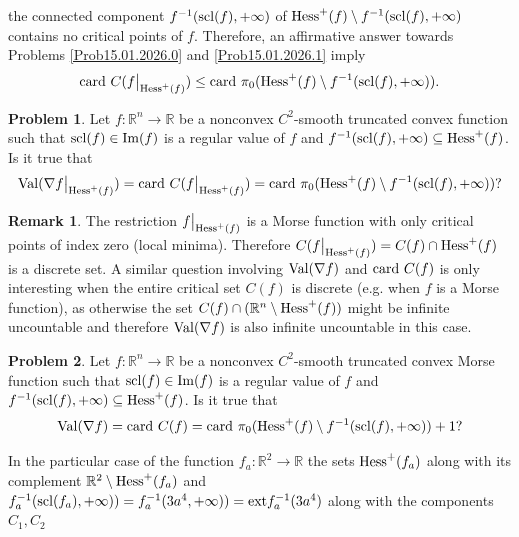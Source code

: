 \documentclass[12pt,twoside,reqno]{amsart}
\theoremstyle{definition}
\newtheorem{remark}{Remark}[section]
\newtheorem{problem}{Problem}[section]
\numberwithin{equation}{section}
\begin{document}
the connected component $f^{-1}({\rm scl}(f),+\infty)$ of 
${\rm Hess}^+(f)\setminus f^{-1}({\rm scl}(f),+\infty)$ contains no critical points of $f$. Therefore, an affirmative answer towards Problems \ref{Prob15.01.2026.0}
and \ref{Prob15.01.2026.1} imply
\[{\rm card}~C(f\big|_{{\rm Hess}^+(f)})\leq {\rm card}~\pi_0({\rm Hess}^+(f)\setminus f^{-1}({\rm scl}(f),+\infty)).\]
\begin{problem}\label{Prob15.01.2026.2}
 Let $f:\mathbb{R}^n\longrightarrow\mathbb{R}$ 
be a nonconvex $C^2$-smooth truncated convex function such that ${\rm scl}(f)\in {\rm Im}(f)$ is
a regular value of $f$ and $f^{-1}({\rm scl}(f),+\infty)\subseteq{\rm Hess}^+(f)$. Is it true that 
\begin{equation}\label{eq15.01.2026.30}
{\rm Val}(\nabla f\big|_{{\rm Hess}^+(f)})={\rm card}~C(f\big|_{{\rm Hess}^+(f)})={\rm card}~\pi_0({\rm Hess}^+(f)\setminus f^{-1}({\rm scl}(f),+\infty))?
\end{equation}
\end{problem}
\begin{remark}
The restriction $f\big|_{{\rm Hess}^+(f)}$ is a Morse function with only critical points of index zero (local minima). 
Therefore $C(f\big|_{{\rm Hess}^+(f)})=C(f)\cap {\rm Hess}^+(f)$ is a discrete set. A similar question involving ${\rm Val}(\nabla f)$ and ${\rm card}~C(f)$ 
is only interesting when the entire critical set $C(f)$ is discrete (e.g. when $f$ is a Morse function), as otherwise the set 
$C(f)\cap(\mathbb{R}^n\setminus {\rm Hess}^+(f))$ might be infinite 
uncountable and therefore ${\rm Val}(\nabla f)$ is also infinite uncountable in this case.
\end{remark}
\begin{problem}\label{Prob15.01.2026.3}
 Let $f:\mathbb{R}^n\longrightarrow\mathbb{R}$ 
be a nonconvex $C^2$-smooth truncated convex Morse function such that ${\rm scl}(f)\in {\rm Im}(f)$ is
a regular value of $f$ and $f^{-1}({\rm scl}(f),+\infty)\subseteq{\rm Hess}^+(f)$. Is it true that 
\begin{equation}\label{eq15.01.2026.3}
{\rm Val}(\nabla f)={\rm card}~C(f)={\rm card}~\pi_0({\rm Hess}^+(f)\setminus f^{-1}({\rm scl}(f),+\infty))+1?
\end{equation}
\end{problem}
In the particular case of the function $f_a:\mathbb{R}^2\longrightarrow\mathbb{R}$ the sets ${\rm Hess}^+(f_a)$ along with its complement 
$\mathbb{R}^2\setminus {\rm Hess}^+(f_a)$ and $f_a^{-1}({\rm scl}(f_a),+\infty))=f_a^{-1}(3a^4,+\infty))={\rm ext}f_a^{-1}(3a^4)$ along with the components $C_1, C_2$ 
\end{document}
